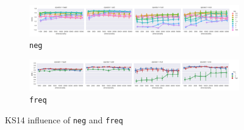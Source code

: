 \begin{figure}
  \centering

  \begin{subfigure}[t]{\textwidth}
    \includegraphics[width=1.1\textwidth]{supplement/figures/KS14-interaction-neg}

  \caption{\texttt{neg}}
  \label{fig:ks14-neg}
  \end{subfigure}

  \begin{subfigure}[t]{\textwidth}
    \includegraphics[width=1.1\textwidth]{supplement/figures/KS14-interaction-freq}

  \caption{\texttt{freq}}
  \label{fig:ks14-freq}
  \end{subfigure}

  \caption{KS14 influence of \texttt{neg} and \texttt{freq}}
\end{figure}
